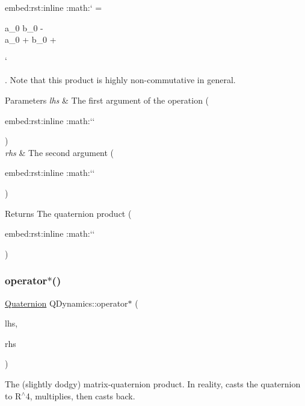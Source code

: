 \begin{DoxyVerb}embed:rst:inline :math:` \otimes {} = \begin{pmatrix} a_0 b_0 -  \cdot {} \\ a_0  + b_0  +  \times {}\end{pmatrix}` \end{DoxyVerb}
. Note that this product is highly non-\/commutative in general. 
\begin{DoxyParams}{Parameters}
{\em lhs} & The first argument of the operation (\begin{DoxyVerb}embed:rst:inline :math:`` \end{DoxyVerb}
) \\
\hline
{\em rhs} & The second argument (\begin{DoxyVerb}embed:rst:inline :math:`` \end{DoxyVerb}
) \\
\hline
\end{DoxyParams}
\begin{DoxyReturn}{Returns}
The quaternion product (\begin{DoxyVerb}embed:rst:inline :math:`\otimes{}` \end{DoxyVerb}
) 
\end{DoxyReturn}
\mbox{\label{namespaceQDynamics_a3382c10ce708c163d79c9fdb5c79b452}} 
\subsubsection{\texorpdfstring{operator$\ast$()}{operator*()}\hspace{0.1cm}{\footnotesize\ttfamily [2/2]}}
{\footnotesize\ttfamily \hyperlink{classQDynamics_1_1Quaternion}{Quaternion} Q\+Dynamics\+::operator$\ast$ (\begin{DoxyParamCaption}\item[{const \hyperlink{classJSL_1_1Matrix}{J\+S\+L\+::\+Matrix} \&}]{lhs,  }\item[{const \hyperlink{classQDynamics_1_1Quaternion}{Quaternion} \&}]{rhs }\end{DoxyParamCaption})\hspace{0.3cm}{\ttfamily [inline]}}



The (slightly dodgy) matrix-\/quaternion product. In reality, casts the quaternion to R$^\wedge$4, multiplies, then casts back. 


